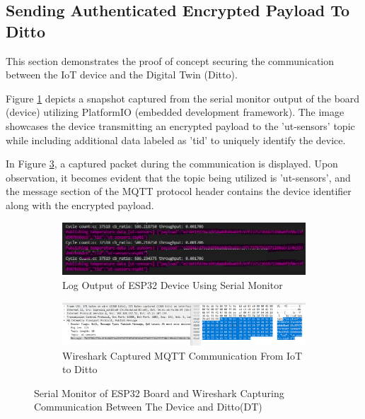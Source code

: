 \subsection{Sending Authenticated Encrypted Payload To Ditto}
\label{sec:sendingauth}

This section demonstrates the proof of concept securing the communication between the IoT device and the Digital Twin (Ditto). 

Figure \ref{fig:log-mon} depicts a snapshot captured from the serial monitor output of the board (device) utilizing PlatformIO (embedded development framework). The image showcases the device transmitting an encrypted payload to the 'ut-sensors' topic while including additional data labeled as 'tid' to uniquely identify the device. 

In Figure \ref{fig:wireshark}, a captured packet during the communication is displayed. Upon observation, it becomes evident that the topic being utilized is 'ut-sensors', and the message section of the MQTT protocol header contains the device identifier along with the encrypted payload.


\begin{figure}[H]
   
    \begin{subfigure}[c]{1\linewidth}
        \centering
        
        \includegraphics[width=\linewidth]{images/fp/serialport.png}
        \caption{Log Output of ESP32 Device Using Serial Monitor}
        \label{fig:log-mon}
     \end{subfigure}    

    \begin{subfigure}[c]{1\linewidth}
        \centering
        
        \includegraphics[width=\linewidth]{images/fp/wireshark.png}
        \caption{Wireshark Captured MQTT Communication From IoT to Ditto}
        \label{fig:wireshark}
    \end{subfigure}
     \caption{Serial Monitor of ESP32 Board and Wireshark Capturing Communication Between The Device and Ditto(DT)}
\end{figure}

